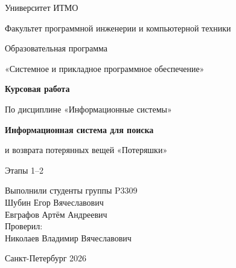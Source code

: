 \documentclass[14pt,a4paper]{extarticle}
\begin{document}
\begin{titlepage}
\begin{center}
{\fontsize{18}{22}\selectfont Университет ИТМО\par}
\vspace{8mm}
{\fontsize{16}{20}\selectfont Факультет программной инженерии и компьютерной техники\par
Образовательная программа\par
«Системное и прикладное программное обеспечение»\par}
\vspace{30mm}
{\fontsize{16}{22}\selectfont\bfseries Курсовая работа\par
По дисциплине «Информационные системы»\par}
\vspace{10mm}
{\fontsize{16}{22}\selectfont\bfseries Информационная система для поиска\par
и возврата потерянных вещей «Потеряшки»\par}
\vspace{8mm}
{\fontsize{16}{20}\selectfont Этапы 1–2\par}
\end{center}
\vspace{20mm}
\begin{flushright}
Выполнили студенты группы P3309\\
Шубин Егор Вячеславович\\
Евграфов Артём Андреевич\\
\vspace{7mm}
Проверил:\\
Николаев Владимир Вячеславович
\end{flushright}
\vfill
\begin{center}
Санкт-Петербург 2026
\end{center}
\end{titlepage}

\tableofcontents


\end{document}
